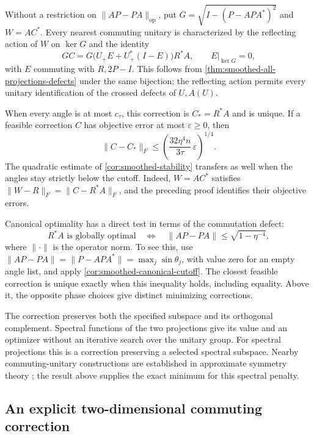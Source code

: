 Without a restriction on $\|AP-PA\|_{\mathrm{op}}$, put
$G=\sqrt{I-(P-APA^*)^2}$ and $W=AC^*$.
Every nearest commuting unitary is characterized by the reflecting
action of $W$ on $\ker G$ and the identity
\[
 GC=G\bigl(U_+E+U_+^*(I-E)\bigr)R^*A,
 \qquad E|_{\ker G}=0,
\]
with $E$ commuting with $R,2P-I$. This follows from
\cref{thm:smoothed-all-projections-defects} under the same bijection;
the reflecting action permits every unitary identification of the
crossed defects of $U,A(U)$.

When every angle is at most $c_\tau$, this correction is $C_*=R^*A$
and is unique. If a feasible correction $C$ has objective error at most
$\varepsilon\geq0$, then
\[
 \|C-C_*\|_F\leq
 \left(\frac{32\eta^4n}{3\tau}\,\varepsilon\right)^{1/4}.
\]
The quadratic estimate of \cref{cor:smoothed-stability} transfers as well
when the angles stay strictly below the cutoff. Indeed,
$W=AC^*$ satisfies
$\|W-R\|_F=\|C-R^*A\|_F$, and the preceding proof identifies their
objective errors.

Canonical optimality has a direct test in terms of the commutation defect:
\[
 R^*A\text{ is globally optimal}
 \quad\Longleftrightarrow\quad
 \|AP-PA\|\leq\sqrt{1-\eta^{-4}},
\]
where $\|\cdot\|$ is the operator norm. To see this, use
$\|AP-PA\|=\|P-APA^*\|=\max_j\sin\theta_j$, with value zero for an
empty angle list, and apply \cref{cor:smoothed-canonical-cutoff}.
The closest feasible correction is unique exactly when this inequality
holds, including equality. Above it, the opposite phase choices give
distinct minimizing corrections.

The correction preserves both the specified subspace and its orthogonal
complement. Spectral functions of the two projections give its value and
an optimizer without an iterative search over the unitary group.
For spectral projections this is a correction preserving a selected
spectral subspace. Nearby commuting-unitary constructions are established
in approximate symmetry theory \citep{chubb2017approximate}; the result
above supplies the exact minimum for this spectral penalty.

\subsection{An explicit two-dimensional commuting correction}
\label{sec:smoothed-worked-example}

